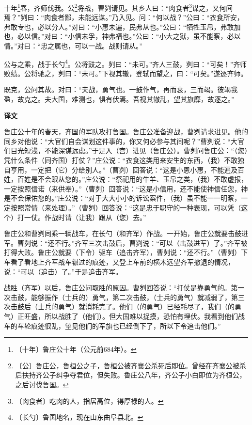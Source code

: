 \documentclass[12pt,UTF-8,openany,a4]{ctexbook}
\begin{document}
\begin{large}
    
    十年\footnote{〔十年〕\yiwen 鲁庄公十年（公元前684年）。}春，齐师伐我。公\footnote{〔公〕\yiwen 鲁庄公，鲁桓公之子，鲁桓公被齐襄公杀死后即位。曾经在齐襄公被杀后扶持齐公子纠争夺君位，但失败。鲁庄公八年，齐公子小白即位为齐桓公，之后讨伐鲁国。}将战，曹刿请见。其乡人曰：“肉食者\footnote{〔肉食者〕\yiwen 吃肉的人，指居高位，得厚禄的人。}谋之，又何间焉？”刿曰：“肉食者鄙，未能远谋。”乃入见。问：“何以战？”公曰：“衣食所安，弗敢专也，必以分人。”对曰：“小惠未遍，民弗从也。”公曰：“牺牲玉帛，弗敢加也，必以信。”对曰：“小信未孚，神弗福也。”公曰：“小大之狱，虽不能察，必以情。”对曰：“忠之属也，可以一战。战则请从。”
    
    公与之乘，战于长勺\footnote{〔长勺〕\yiwen 鲁国地名，现在山东曲阜县北。}。公将鼓之。刿曰：“未可。”齐人三鼓，刿曰：“可矣！”齐师败绩。公将驰之，刿曰：“未可。”下视其辙，登轼而望之，曰：“可矣。”遂逐齐师。
    
    既克，公问其故。对曰：“夫战，勇气也。一鼓作气，再而衰，三而竭。彼竭我盈，故克之。夫大国，难测也，惧有伏焉。吾视其辙乱，望其旗靡，故逐之。”
\end{large}


\newpage

\begin{Large}
    \noindent\textbf{译文}
\end{Large}


\vspace{1em}

\begin{large}
    \yiwen 
    鲁庄公十年的春天，齐国的军队攻打鲁国。鲁庄公准备迎战，曹刿请求进见。他的同乡对他说：“大官们自会谋划这件事的，你又何必参与其间呢？”曹刿说：“大官们目光短浅，不能深谋远虑。”于是入（宫）进见（鲁庄公）。曹刿问鲁庄公：“（您）凭什么条件（同齐国）打仗？”庄公说：“衣食这类用来安生的东西，（我）不敢独自亨用，一定把（它）分给别人。”（曹刿）回答说：“这是小恩小惠，不能遍及百姓，百姓是不会跟从您的。”庄公说：“祭祀用的牛羊、玉帛之类，（我）不敢虚报，一定按照信诺（来供奉）。”（曹刿）回答说：“这是小信用，还不能使神信任您，神是不会保佑您的。”庄公说：“对于大大小小的诉讼案件，（我）虽不能一一明察，一定按照常情（来处理）。”（曹刿）回答说：“这是忠于职守的一种表现，可以凭（这个）打一仗。作战时请（让我）跟从（您）去。”
    
    鲁庄公和曹刿同乘一辆战车，在长勺（和齐军）作战。一开始，鲁庄公就要击鼓进军。曹刿说：“还不行。”齐军三次击鼓后，曹刿说：“可以（击鼓进军）了。”齐军被打得大败。鲁庄公就要（下令）驱车（追击齐军），曹刿说：“还不行。”（曹刿）下车看了看地上齐军战车辗过的痕迹，又登上车前的横木远望齐军撤退的情况，说：“可以（追击）了。”于是追击齐军。
    
    战胜（齐军）以后，鲁庄公问取胜的原因。曹刿回答说：“打仗是靠勇气的。第一次击鼓，能够振作（士兵的）勇气，第二次击鼓，（士兵的勇气）就减弱了，第三次击鼓后（士兵的勇气）就消耗完了。他们（的勇气）已经耗尽了，我们（的勇气）正旺盛，所以战胜了（他们）。但大国难以捉摸，恐怕有埋伏。我看到他们战车的车轮痕迹很乱，望见他们的军旗也已经倒下了，所以下令追击他们。”
    
\end{large}
\end{document}
